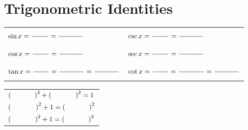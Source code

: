 \documentclass{siproblemset}
\newcommand{\anscolor}{\color{white}\hspace{0.5cm}}
\begin{document}
    \section{Trigonometric Identities}
    {\Large \begin{tabularx}{\textwidth}{XX}
    	$\sin x=\dfrac{\anscolor O}{\anscolor H}=\dfrac{\anscolor 1}{\anscolor \csc{x}}$\vspace{0.25cm}                                               & $\csc x=\dfrac{\anscolor H}{\anscolor O}=\dfrac{\anscolor 1}{\anscolor \sin{x}}$\vspace{0.25cm}                                               \\
    	$\cos x=\dfrac{\anscolor A}{\anscolor H}=\dfrac{\anscolor 1}{\anscolor \sec{x}}$\vspace{0.25cm}                                               & $\sec x=\dfrac{\anscolor H}{\anscolor A}=\dfrac{\anscolor 1}{\anscolor \cos{x}}$\vspace{0.25cm}                                               \\
    	$\tan x=\dfrac{\anscolor O}{\anscolor A}=\dfrac{\anscolor 1}{\anscolor \cot{x}}=\dfrac{\anscolor \sin x}{\anscolor \cos{x}}$\vspace{0.25cm} & $\cot x=\dfrac{\anscolor A}{\anscolor O}=\dfrac{\anscolor 1}{\anscolor \tan{x}}=\dfrac{\anscolor \cos x}{\anscolor \sin{x}}$\vspace{0.25cm}
    \end{tabularx}}


    {\Large \begin{tabularx}{\textwidth}{X}
    	$\paren{{\anscolor \sin x}}^2+\paren{{\anscolor \cos x}}^2=1$ \\ $\paren{{\anscolor \tan x}}^2+1=\paren{{\anscolor \sec x}}^2$ \\ $\paren{{\anscolor \cot x}}^2+1=\paren{{\anscolor \csc x}}^2$
    \end{tabularx}}
    
\end{document}
